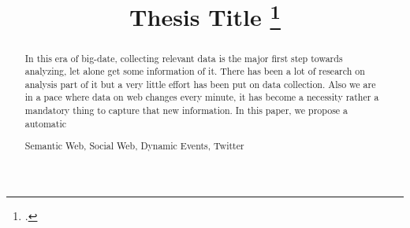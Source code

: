 \documentclass[runningheads,a4paper]{llncs}
\newcommand{\keywords}[1]{\par\addvspace\baselineskip
\noindent\keywordname\enspace\ignorespaces#1}
\begin{document}
\mainmatter  %

\title{Thesis Title \thanks{.}}


%
%
%

\author{}


%
%

\maketitle

\begin{abstract}
In this era of big-date, collecting relevant data is the major first step towards analyzing, let alone get some information of it. There has been a lot of research on analysis part of it but a very little effort has been put on data collection. Also we are in a pace where data on web changes every minute, it has become a necessity rather a mandatory thing to capture that new information. In this paper, we propose a automatic 
\keywords{Semantic Web, Social Web, Dynamic Events, Twitter}
\end{abstract}

%
%
% 
%
%




\end{document}
